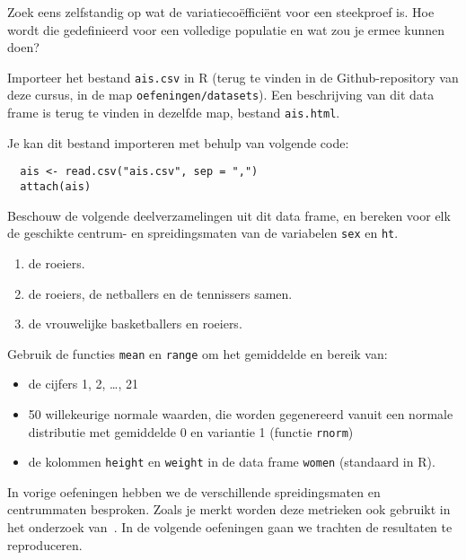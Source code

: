 \begin{exercise}
  Zoek eens zelfstandig op wat de variatieco\"effici\"ent voor een steekproef is. Hoe wordt die gedefinieerd voor een volledige populatie en wat zou je ermee kunnen doen?
\end{exercise}

\begin{exercise}
  \label{ex:ais}
  Importeer het bestand \texttt{ais.csv} in R (terug te vinden in de Github-repository van deze cursus, in de map \texttt{oefeningen/datasets}). 
  Een beschrijving van dit data frame is terug te vinden in dezelfde map, bestand \texttt{ais.html}.
  
  Je kan dit bestand importeren met behulp van volgende code:
  \begin{lstlisting}
  ais <- read.csv("ais.csv", sep = ",")
  attach(ais)
  \end{lstlisting}
  
  Beschouw de volgende deelverzamelingen uit dit data frame, 
  en bereken voor elk de geschikte centrum- en spreidingsmaten van de variabelen \texttt{sex} en \texttt{ht}.
  
  \begin{enumerate}
    \item de roeiers.
    \item de roeiers, de netballers en de tennissers samen.
    \item de vrouwelijke basketballers en roeiers.
  \end{enumerate}
\end{exercise}

\begin{exercise}
Gebruik de functies \texttt{mean} en \texttt{range} om het gemiddelde en bereik van:
\begin{itemize}
  \item de cijfers 1, 2, \dots, 21 
  \item 50 willekeurige normale waarden, die  worden gegenereerd vanuit een normale distributie met gemiddelde 0 en variantie 1 (functie \texttt{rnorm})
  \item de kolommen \texttt{height} en \texttt{weight} in de data frame \texttt{women} (standaard in R).
\end{itemize}
\end{exercise}

In vorige oefeningen hebben we de verschillende spreidingsmaten en centrummaten besproken. Zoals je merkt worden deze metrieken ook gebruikt in het onderzoek van~\textcite{Akin2016}. In de volgende oefeningen gaan we trachten de resultaten te reproduceren.

